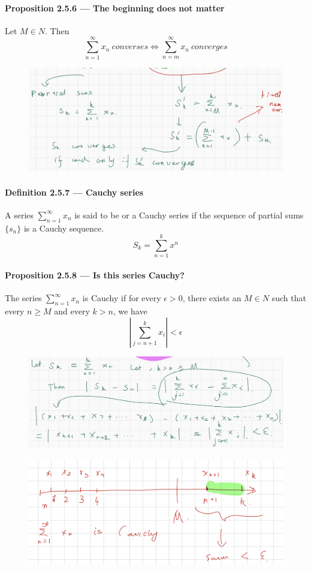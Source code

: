 \documentclass{article}
\begin{document}
\paragraph{Proposition 2.5.6 — The beginning does not matter}
Let $M\in N$. Then $$\sum_{n=1}^{\infty}x_n \ converses \Longleftrightarrow \sum_{n=m}^{\infty}x_n \ converges$$
\begin{figure}[H]
    \centering
    \includegraphics{0136}
\end{figure}
\paragraph{Definition 2.5.7 — Cauchy series}
A series $\sum_{n=1}^{\infty}x_n$ is said to be or a Cauchy series if the sequence of partial sums $\{s_n\}$ is a Cauchy sequence.
$$S_k=\sum_{n=1}^{k}x^n$$
\paragraph{Proposition 2.5.8 — Is this series Cauchy?}
The series $\sum_{n=1}^{\infty}x_n$ is Cauchy if for every $\epsilon >0$, there exists an $M\in N$ such that every $n\ge M$ and every $k>n$, we have $$|\sum_{j=n+1}^{k}x_i|<\epsilon$$
\begin{figure}[H]
    \centering
    \includegraphics{0137}
\end{figure}
\begin{figure}[H]
    \centering
    \includegraphics{0138}
\end{figure}
\end{document}
